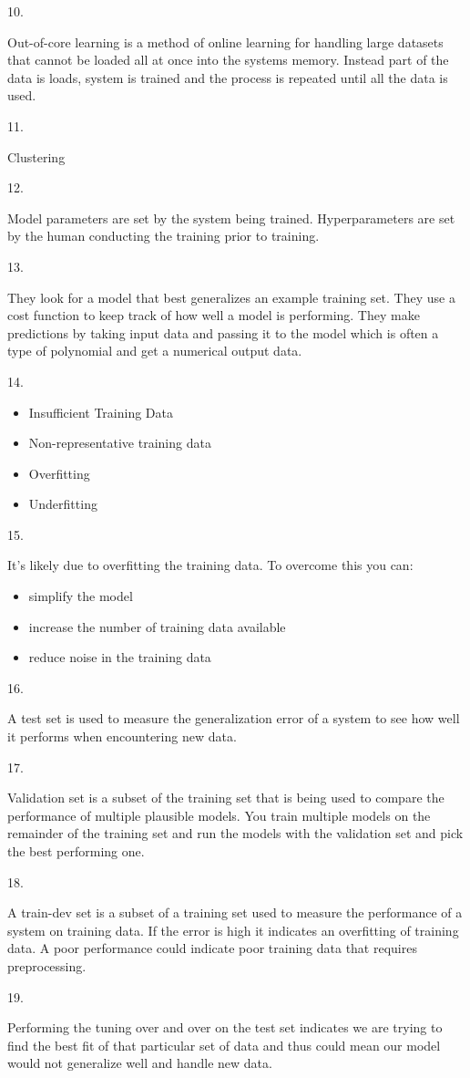 \documentclass[12]{article}
\begin{document}
10.

Out-of-core learning is a method of online learning for handling large datasets that cannot be loaded all at once into the systems memory. Instead part of the data is loads, system is trained and the process is repeated until all the data is used.

11.

Clustering

12.

Model parameters are set by the system being trained. Hyperparameters are set by the human conducting the training prior to training.

13.

They look for a model that best generalizes an example training set. They use a cost function to keep track of how well a model is performing. They make predictions by taking input data and passing it to the model which is often a type of polynomial and get a numerical output data.

14.

\begin{itemize}
	\item Insufficient Training Data
	\item Non-representative training data
	\item Overfitting
	\item Underfitting
\end{itemize}

15.

It's likely due to overfitting the training data. To overcome this you can:
\begin{itemize}
	\item simplify the model
	\item increase the number of training data available
	\item reduce noise in the training data
\end{itemize}

16.

A test set is used to measure the generalization error of a system to see how well it performs when encountering new data.

17.

Validation set is a subset of the training set that is being used to compare the performance of multiple plausible models. You train multiple models on the remainder of the training set and run the models with the validation set and pick the best performing one.

18.

A train-dev set is a subset of a training set used to measure the performance of a system on training data. If the error is high it indicates an overfitting of training data. A poor performance could indicate poor training data that requires preprocessing.

19.

Performing the tuning over and over on the test set indicates we are trying to find the best fit of that particular set of data and thus could mean our model would not generalize well and handle new data.
\end{document}
